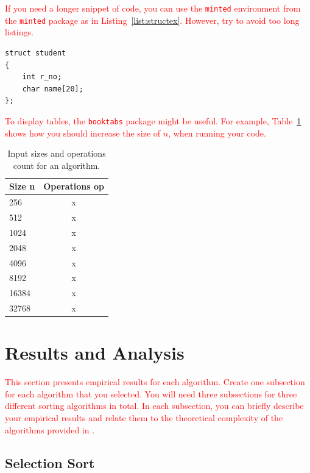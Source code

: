 \documentclass{scrartcl}
\begin{document}
\textcolor{red}{If you need a longer snippet of code, you can use the \texttt{minted} environment from the \texttt{minted} package as in Listing~\ref{list:structex}. However, try to avoid too long listings.}

\begin{listing}[h]
\begin{verbatim}
struct student 
{
    int r_no;  
    char name[20];  
};
\end{verbatim}
\caption{Example of a short code snippet.}
\label{list:structex}
\end{listing}

\lipsum[1]

\textcolor{red}{To display tables, the \texttt{booktabs} package might be useful. For example, Table~\ref{tab:runs} shows how you should increase the  size of $n$, when running your code.}

\begin{table}
\centering
\caption{Input sizes and operations count for an algorithm.}
\label{tab:runs}
	\begin{tabular}{lc}
	\toprule
	\textbf{Size n} & \textbf{Operations op}\\
	\midrule
	256   &  x\\
	512   &  x\\
	1024  &  x\\
	2048  &  x\\
	4096  &  x\\
	8192  &  x\\
	16384 &  x\\
	32768 &  x\\
	\bottomrule
	\end{tabular}
\end{table}


\section{Results and Analysis}
\label{sec:results-analysis}

\textcolor{red}{This section presents empirical results for each algorithm. Create one subsection for each algorithm that you selected. You will need three subsections for three different sorting algorithms in total. In each subsection, you can briefly describe your empirical results and relate them to the theoretical complexity of the algorithms provided in \cite{levitin11}.}


\subsection{Selection Sort}
\label{sec:selectionsort}
\end{document}
